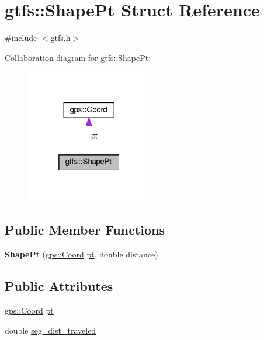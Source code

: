 \hypertarget{structgtfs_1_1ShapePt}{}\section{gtfs\+:\+:Shape\+Pt Struct Reference}
\label{structgtfs_1_1ShapePt}


{\ttfamily \#include $<$gtfs.\+h$>$}



Collaboration diagram for gtfs\+:\+:Shape\+Pt\+:\nopagebreak
\begin{figure}[H]
\begin{center}
\leavevmode
\includegraphics[width=157pt]{structgtfs_1_1ShapePt__coll__graph}
\end{center}
\end{figure}
\subsection*{Public Member Functions}
\begin{DoxyCompactItemize}
\item 
\mbox{\label{structgtfs_1_1ShapePt_a34e7da183770e2ab8360e286596ff18a}} 
{\bfseries Shape\+Pt} (\hyperlink{classgps_1_1Coord}{gps\+::\+Coord} \hyperlink{structgtfs_1_1ShapePt_ab79eb8263213afd27be9b257fca8515a}{pt}, double distance)
\end{DoxyCompactItemize}
\subsection*{Public Attributes}
\begin{DoxyCompactItemize}
\item 
\hyperlink{classgps_1_1Coord}{gps\+::\+Coord} \hyperlink{structgtfs_1_1ShapePt_ab79eb8263213afd27be9b257fca8515a}{pt}
\item 
double \hyperlink{structgtfs_1_1ShapePt_ad3fe477575279af15fe33e0ce36eaad2}{seg\+\_\+dist\+\_\+traveled}
\end{DoxyCompactItemize}


